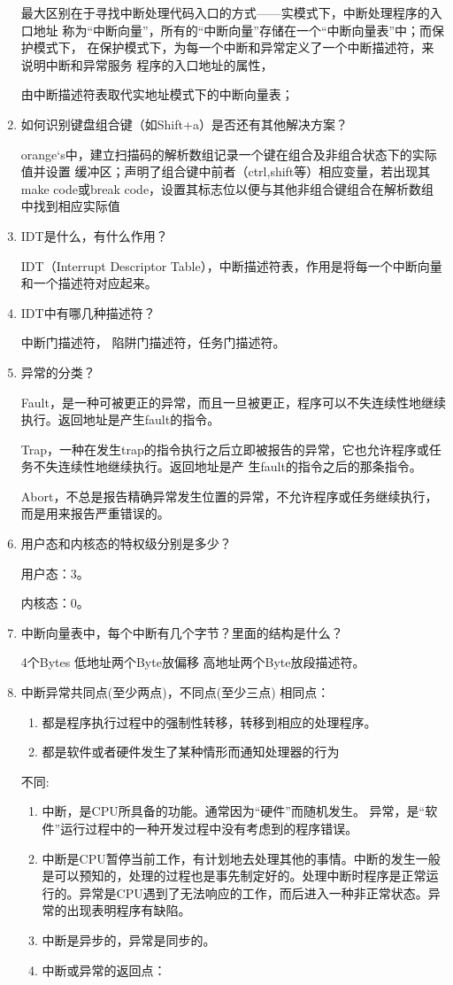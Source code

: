 \documentclass[a4paper]{article}
\begin{document}
\begin{enumerate}
	最大区别在于寻找中断处理代码入口的方式——实模式下，中断处理程序的入口地址
称为“中断向量”，所有的“中断向量”存储在一个“中断向量表”中；而保护模式下，
在保护模式下，为每一个中断和异常定义了一个中断描述符，来说明中断和异常服务
程序的入口地址的属性，

由中断描述符表取代实地址模式下的中断向量表；
	\item 如何识别键盘组合键（如Shift+a）是否还有其他解决方案？
	
	orange‘s中，建立扫描码的解析数组记录一个键在组合及非组合状态下的实际值并设置
缓冲区；声明了组合键中前者（ctrl,shift等）相应变量，若出现其make code或break 
code，设置其标志位以便与其他非组合键组合在解析数组中找到相应实际值
	\item IDT是什么，有什么作用？
	
	IDT（Interrupt Descriptor Table），中断描述符表，作用是将每一个中断向量和一个描述符对应起来。
	\item IDT中有哪几种描述符？
	
	中断门描述符， 陷阱门描述符，任务门描述符。
	\item 异常的分类？
	
	Fault，是一种可被更正的异常，而且一旦被更正，程序可以不失连续性地继续执行。返回地址是产生fault的指令。
	
   Trap，一种在发生trap的指令执行之后立即被报告的异常，它也允许程序或任务不失连续性地继续执行。返回地址是产	生fault的指令之后的那条指令。
   
   Abort，不总是报告精确异常发生位置的异常，不允许程序或任务继续执行，而是用来报告严重错误的。
	\item 用户态和内核态的特权级分别是多少？
	
	用户态：3。
	
   内核态：0。
	\item 中断向量表中，每个中断有几个字节？里面的结构是什么？
	
	4个Bytes 低地址两个Byte放偏移 高地址两个Byte放段描述符。
	\item 中断异常共同点(至少两点)，不同点(至少三点)
	相同点：
	\begin{enumerate}
	\item 都是程序执行过程中的强制性转移，转移到相应的处理程序。
      	\item  都是软件或者硬件发生了某种情形而通知处理器的行为
	\end{enumerate}
   	不同:
	\begin{enumerate}
	\item 中断，是CPU所具备的功能。通常因为“硬件”而随机发生。 异常，是“软件”运行过程中的一种开发过程中没有考虑到的程序错误。
         \item 中断是CPU暂停当前工作，有计划地去处理其他的事情。中断的发生一般是可以预知的，处理的过程也是事先制定好的。处理中断时程序是正常运行的。异常是CPU遇到了无法响应的工作，而后进入一种非正常状态。异常的出现表明程序有缺陷。
        	\item 中断是异步的，异常是同步的。
        \item 中断或异常的返回点：
        

\end{enumerate}
\end{enumerate}
\end{document}
